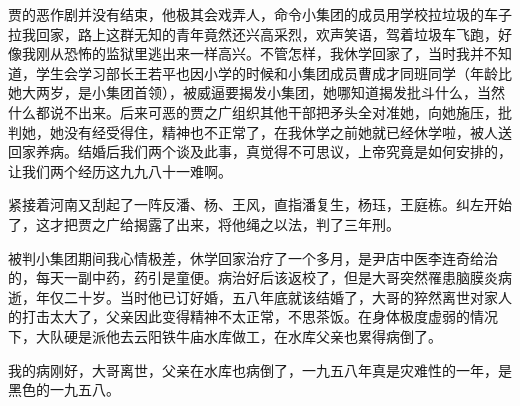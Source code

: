 贾的恶作剧并没有结束，他极其会戏弄人，命令小集团的成员用学校拉垃圾的车子拉我回家，路上这群无知的青年竟然还兴高采烈，欢声笑语，驾着垃圾车飞跑，好像我刚从恐怖的监狱里逃出来一样高兴。不管怎样，我休学回家了，当时我并不知道，学生会学习部长王若平也因小学的时候和小集团成员曹成才同班同学（年龄比她大两岁，是小集团首领），被威逼要揭发小集团，她哪知道揭发批斗什么，当然什么都说不出来。后来可恶的贾之广组织其他干部把矛头全对准她，向她施压，批判她，她没有经受得住，精神也不正常了，在我休学之前她就已经休学啦，被人送回家养病。结婚后我们两个谈及此事，真觉得不可思议，上帝究竟是如何安排的，让我们两个经历这九九八十一难啊。

紧接着河南又刮起了一阵反潘、杨、王风，直指潘复生，杨珏，王庭栋。纠左开始了，这才把贾之广给揭露了出来，将他绳之以法，判了三年刑。

被判小集团期间我心情极差，休学回家治疗了一个多月，是尹店中医李连奇给治的，每天一副中药，药引是童便。病治好后该返校了，但是大哥突然罹患脑膜炎病逝，年仅二十岁。当时他已订好婚，五八年底就该结婚了，大哥的猝然离世对家人的打击太大了，父亲因此变得精神不太正常，不思茶饭。在身体极度虚弱的情况下，大队硬是派他去云阳铁牛庙水库做工，在水库父亲也累得病倒了。

我的病刚好，大哥离世，父亲在水库也病倒了，一九五八年真是灾难性的一年，是黑色的一九五八。

